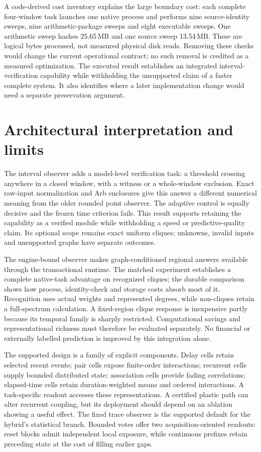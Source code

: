 \documentclass[11pt,a4paper]{article}
\theoremstyle{definition}\newtheorem{definition}[theorem]{Definition}
\begin{document}
A code-derived cost inventory explains the large boundary cost: each complete four-window task launches one native process and performs nine source-identity sweeps, nine arithmetic-package sweeps and eight executable sweeps. One arithmetic sweep hashes 25.65\,MB and one source sweep 13.54\,MB. These are logical bytes processed, not measured physical disk reads. Removing these checks would change the current operational contract; no such removal is credited as a measured optimization. The executed result establishes an integrated interval-verification capability while withholding the unsupported claim of a faster complete system. It also identifies where a later implementation change would need a separate preservation argument.

\section{Architectural interpretation and limits}
The interval observer adds a model-level verification task: a threshold crossing anywhere in a closed window, with a witness or a whole-window exclusion. Exact raw-input normalization and Arb enclosures give this answer a different numerical meaning from the older rounded point observer. The adaptive control is equally decisive and the frozen time criterion fails. This result supports retaining the capability as a verified module while withholding a speed or predictive-quality claim. Its optional scope remains exact uniform cliques; unknowns, invalid inputs and unsupported graphs have separate outcomes.

The engine-bound observer makes graph-conditioned regional answers available through the transactional runtime. The matched experiment establishes a complete native-task advantage on recognized cliques; the durable comparison shows how process, identity-check and storage costs absorb most of it. Recognition uses actual weights and represented degrees, while non-cliques retain a full-spectrum calculation. A fixed-region clique response is inexpensive partly because its temporal family is sharply restricted. Computational savings and representational richness must therefore be evaluated separately. No financial or externally labelled prediction is improved by this integration alone.

The supported design is a family of explicit components. Delay cells retain selected recent events; pair cells expose finite-order interactions; recurrent cells supply bounded distributed state; association cells provide fading correlations; elapsed-time cells retain duration-weighted means and ordered interactions. A task-specific readout accesses these representations. A certified plastic path can alter recurrent coupling, but its deployment should depend on an ablation showing a useful effect. The fixed trace observer is the supported default for the hybrid's statistical branch. Bounded votes offer two acquisition-oriented readouts: reset blocks admit independent local exposure, while continuous prefixes retain preceding state at the cost of filling earlier gaps.
\end{document}
